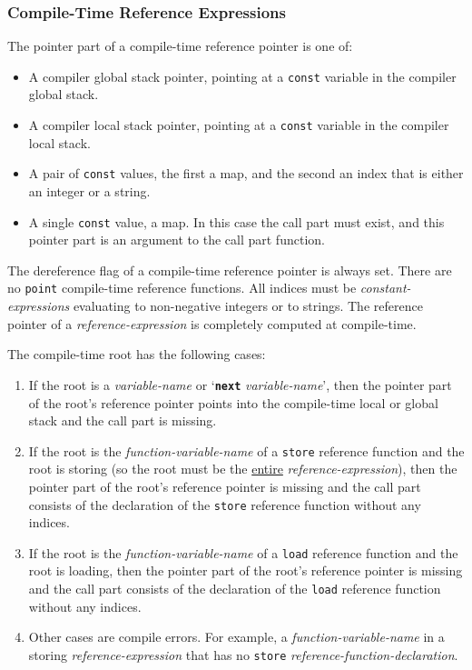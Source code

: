 \documentclass[12pt]{article}
\newcommand{\TT}[1]{{\tt \bfseries #1}}
\begin{document}
\subsubsection{Compile-Time Reference Expressions}
\label{COMPILE-TIME-REFERENCE-EXPRESSIONS}

The pointer part of a compile-time reference pointer is one of:
\begin{itemize}
\item A compiler global stack pointer, pointing at a {\tt const}
variable in the compiler global stack.
\item A compiler local stack pointer, pointing at a {\tt const}
variable in the compiler local stack.
\item A pair of {\tt const} values, the first a map, and the
second an index that is either an integer or a string.
\item A single {\tt const} value, a map.  In this case the call
part must exist, and this pointer part is an argument to the call part
function.
\end{itemize}
The dereference flag of a compile-time reference pointer is
always set.  There are no {\tt point} compile-time reference functions.
All indices must be {\em constant-expressions} evaluating to non-negative
integers or to strings.  The reference pointer of a
{\em reference-expression} is completely computed at compile-time.

The compile-time root has the following cases:
\begin{enumerate}
\item If the root is a {\em variable-name} or
`\TT{next} {\em variable-name}', then the pointer part of the root's
reference pointer points into the compile-time local or global stack
and the call part is missing.
\item If the root is the {\em function-variable-name} of a
{\tt store} reference function and the root is storing
(so the root must be the \underline{entire} {\em reference-expression}),
then the pointer part of the root's
reference pointer is missing
and the call part consists of the
declaration of the {\tt store} reference function without any indices.
\item If the root is the {\em function-variable-name} of a
{\tt load} reference function
and the root is loading,
then the pointer part of the root's
reference pointer is missing and the call part consists of the
declaration of the {\tt load} reference function without any indices.
\item Other cases are compile errors.
For example, a {\em function-variable-name}
in a storing {\em reference-expression} that has no {\tt store}
{\em reference-function-declaration}.
\end{enumerate}
\end{document}
